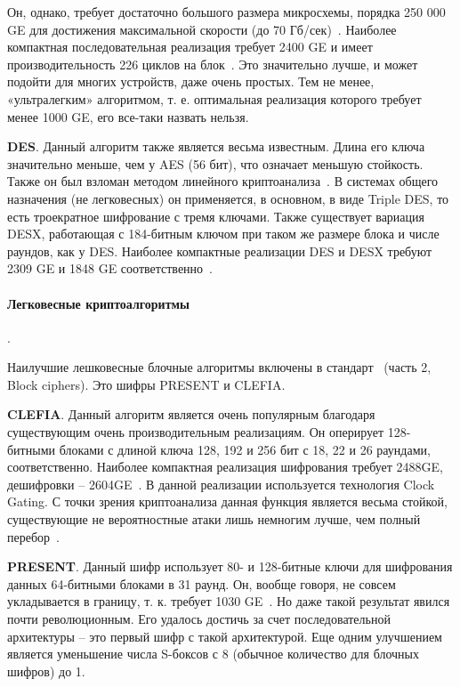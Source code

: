 Он, однако, требует достаточно большого размера микросхемы, порядка 250 000 GE  для достижения максимальной скорости (до 70 Гб/сек)~\cite{src33}. Наиболее компактная последовательная реализация требует 2400 GE  и имеет производительность 226 циклов на блок~\cite{src34}. Это значительно лучше, и может подойти для многих устройств, даже очень простых. Тем не менее, «ультралегким» алгоритмом, т. е. оптимальная реализация которого требует менее 1000 GE, его все-таки назвать нельзя.

\textbf{DES}. Данный алгоритм также является весьма известным. Длина его ключа значительно меньше, чем у AES (56 бит), что означает меньшую стойкость. Также он был взломан методом линейного криптоанализа~\cite{src35}. В системах общего назначения (не легковесных) он применяется, в основном, в виде Triple DES, то есть троекратное шифрование с тремя ключами. Также существует вариация DESX, работающая с 184-битным ключом при таком же размере блока и числе раундов, как у DES. Наиболее компактные реализации DES и DESX требуют 2309 GE и 1848 GE соответственно~\cite{src36}.

\paragraph{Легковесные криптоалгоритмы}. \newline

Наилучшие лешковесные блочные алгоритмы включены в стандарт~\cite{src26} (часть 2, Block ciphers). Это шифры PRESENT и CLEFIA.

\textbf{CLEFIA}. Данный алгоритм является очень популярным благодаря существующим очень производительным реализациям. Он оперирует 128-битными блоками с длиной ключа 128, 192 и 256 бит с 18, 22 и 26 раундами, соответственно. Наиболее компактная реализация шифрования требует 2488GE, дешифровки – 2604GE~\cite{src37}. В данной реализации используется технология Clock Gating. С точки зрения криптоанализа данная функция является весьма стойкой, существующие не вероятностные атаки лишь немногим лучше, чем полный перебор~\cite{src38}.

\textbf{PRESENT}. Данный шифр использует 80- и 128-битные ключи для шифрования данных 64-битными блоками в 31 раунд. Он, вообще говоря, не совсем укладывается в границу, т. к. требует 1030 GE~\cite{src39}. Но даже такой результат явился почти революционным. Его удалось достичь за счет последовательной архитектуры – это первый шифр с такой архитектурой. Еще одним улучшением является уменьшение числа S-боксов с 8 (обычное количество для блочных шифров) до 1.

